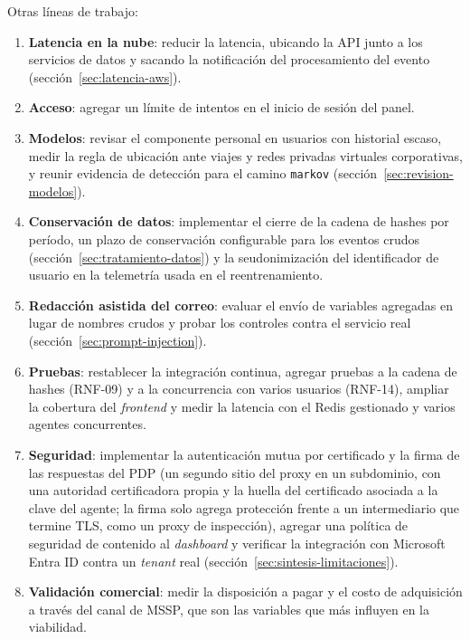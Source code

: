 Otras líneas de trabajo:
\begin{enumerate}
  \item \textbf{Latencia en la nube}: reducir la latencia, ubicando la API junto a los servicios de datos
        y sacando la notificación del procesamiento del evento (sección~\ref{sec:latencia-aws}).
  \item \textbf{Acceso}: agregar un límite de intentos en el inicio de sesión del panel.
  \item \textbf{Modelos}: revisar el componente personal en usuarios con historial escaso, medir la regla de ubicación ante viajes y redes privadas virtuales corporativas, y reunir evidencia de
        detección para el camino \texttt{markov} (sección~\ref{sec:revision-modelos}).
  \item \textbf{Conservación de datos}: implementar el cierre de la cadena de hashes por período,
        un plazo de conservación configurable para los eventos crudos (sección~\ref{sec:tratamiento-datos}) y la seudonimización del identificador de usuario en la telemetría usada en el reentrenamiento.
  \item \textbf{Redacción asistida del correo}: evaluar el envío de variables agregadas en lugar de
        nombres crudos y probar los controles contra el servicio real (sección~\ref{sec:prompt-injection}).
  \item \textbf{Pruebas}: restablecer la integración continua, agregar pruebas a la cadena de hashes (RNF-09) y a la concurrencia con varios usuarios (RNF-14), ampliar la cobertura del \emph{frontend} y medir la latencia con
        el Redis gestionado y varios agentes concurrentes.
  \item \textbf{Seguridad}: implementar la autenticación mutua por certificado y la firma de las respuestas del PDP (un segundo sitio del
        proxy en un subdominio, con una autoridad certificadora propia y la huella del certificado
        asociada a la clave del agente; la firma solo agrega protección frente a un intermediario que termine TLS,
        como un proxy de inspección), agregar una política de seguridad de contenido al
        \emph{dashboard} y verificar la integración con Microsoft Entra ID contra un \emph{tenant} real (sección~\ref{sec:sintesis-limitaciones}).
  \item \textbf{Validación comercial}: medir la disposición a pagar y el costo de adquisición a
        través del canal de MSSP, que son las variables que más influyen en la viabilidad.
\end{enumerate}
